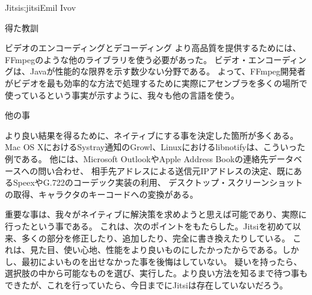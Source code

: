 \begin{aosachapter}{Jitsi}{s:jitsi}{Emil Ivov}
\begin{aosasect1}{得た教訓}
\begin{aosasect2}{ビデオのエンコーディングとデコーディング}
より高品質を提供するためには、FFmpegのような他のライブラリを使う必要があった。
ビデオ・エンコーディングは、Javaが性能的な限界を示す数少ない分野である。
よって、FFmpeg開発者がビデオを最も効率的な方法で処理するために実際にアセンブラを多くの場所で使っているという事実が示すように、我々も他の言語を使う。

\end{aosasect2}

\begin{aosasect2}{他の事}

より良い結果を得るために、ネイティブにする事を決定した箇所が多くある。
Mac OS XにおけるSystray通知のGrowl、Linuxにおけるlibnotifyは、こういった例である。
他には、Microsoft OutlookやApple Address Bookの連絡先データベースへの問い合わせ、
相手先アドレスによる送信元IPアドレスの決定、既にあるSpeexやG.722のコーデック実装の利用、
デスクトップ・スクリーンショットの取得、キャラクタのキーコードへの変換がある。

\end{aosasect2}

重要な事は、我々がネイティブに解決策を求めようと思えば可能であり、実際に行ったという事である。
これは、次のポイントをもたらした。Jitsiを初めて以来、多くの部分を修正したり、追加したり、完全に書き換えたりしている。
これは、見た目、使い心地、性能をより良いものにしたかったからである。しかし、最初によいものを出せなかった事を後悔はしていない。
疑いを持ったら、選択肢の中から可能なものを選び、実行した。より良い方法を知るまで待つ事もできたが、これを行っていたら、今日までにJitsiは存在していないだろう。


\end{aosasect1}
\end{aosachapter}
